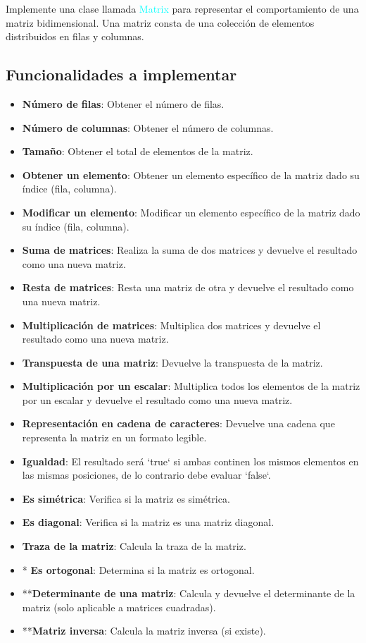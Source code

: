 Implemente una clase llamada \textcolor{cyan}{Matrix} para representar el comportamiento de una matriz bidimensional. Una matriz consta de una colección de elementos distribuidos en filas y columnas.

\subsection*{Funcionalidades a implementar}
\begin{itemize}
    \item \textbf{Número de filas}: Obtener el número de filas.
    \item \textbf{Número de columnas}: Obtener el número de columnas.
    \item \textbf{Tamaño}: Obtener el total de elementos de la matriz.
    \item \textbf{Obtener un elemento}: Obtener un elemento específico de la matriz dado su índice (fila, columna).
    \item \textbf{Modificar un elemento}: Modificar un elemento específico de la matriz dado su índice (fila, columna).
    \item \textbf{Suma de matrices}: Realiza la suma de dos matrices y devuelve el resultado como una nueva matriz.
    \item \textbf{Resta de matrices}: Resta una matriz de otra y devuelve el resultado como una nueva matriz.
    \item \textbf{Multiplicación de matrices}: Multiplica dos matrices y devuelve el resultado como una nueva matriz.
    \item \textbf{Transpuesta de una matriz}: Devuelve la transpuesta de la matriz.
    \item \textbf{Multiplicación por un escalar}: Multiplica todos los elementos de la matriz por un escalar y devuelve el resultado como una nueva matriz.
    \item \textbf{Representación en cadena de caracteres}: Devuelve una cadena que representa la matriz en un formato legible.
    \item \textbf{Igualdad}: El resultado será `true` si ambas continen los mismos elementos en las mismas posiciones, de lo contrario debe evaluar `false`.
    \item \textbf{Es simétrica}: Verifica si la matriz es simétrica.
    \item \textbf{Es diagonal}: Verifica si la matriz es una matriz diagonal.
    \item \textbf{Traza de la matriz}: Calcula la traza de la matriz.
    \item * \textbf{Es ortogonal}: Determina si la matriz es ortogonal.
    \item **\textbf{Determinante de una matriz}: Calcula y devuelve el determinante de la matriz (solo aplicable a matrices cuadradas).
    \item **\textbf{Matriz inversa}: Calcula la matriz inversa (si existe).
\end{itemize}
